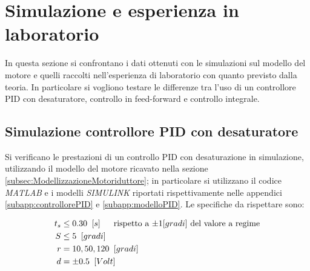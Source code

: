 \section{Simulazione e esperienza in laboratorio}
\label{sec:simLab}

	In questa sezione si confrontano i dati ottenuti con le simulazioni sul modello del motore e quelli raccolti nell'esperienza di laboratorio con quanto previsto dalla teoria. In particolare si vogliono testare le differenze tra l'uso di un controllore PID con desaturatore, controllo in feed-forward e controllo integrale.
	
	\subsection{Simulazione controllore PID con desaturatore}
	\label{subsec:PIDdesaSim}
	
		Si verificano le prestazioni di un controllo PID con desaturazione in simulazione, utilizzando il modello del motore ricavato nella sezione \ref{subsec:ModellizzazioneMotoriduttore}; in particolare si utilizzano il codice \textit{MATLAB} e i modelli \textit{SIMULINK} riportati rispettivamente nelle appendici \ref{subapp:controllorePID} e \ref{subapp:modelloPID}. 
		\newline Le specifiche da rispettare sono:
		
		\begin{align*}
			t_s &\le 0.30 \singleSpacing [s] \trippleSpacing \textnormal{rispetto a $\pm 1 [gradi]$ del valore a regime} \\
			S &\le 5 \singleSpacing [gradi] \\
			r &= 10,50,120 \singleSpacing [gradi] \\
			d &= \pm 0.5 \singleSpacing [Volt] \\
		\end{align*}
		
